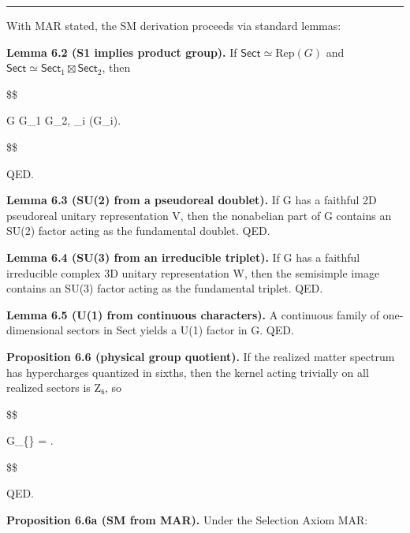 \documentclass[11pt,a4paper]{article}
\theoremstyle{remark}
\begin{document}
\begin{center}\rule{0.5\linewidth}{0.5pt}\end{center}

With MAR stated, the SM derivation proceeds via standard lemmas:

\textbf{Lemma 6.2 (S1 implies product group).} If
\(\mathsf{Sect} \simeq \mathrm{Rep}(G)\) and
\(\mathsf{Sect} \simeq \mathsf{Sect}_1 \boxtimes \mathsf{Sect}_2\),
then

\$\$

G \cong G\_1 \times G\_2,
\qquad
{}\_i \simeq {}(G\_i).

\$\$

QED.

\textbf{Lemma 6.3 (SU(2) from a pseudoreal doublet).} If G has a faithful
2D pseudoreal unitary representation V, then the nonabelian part of G
contains an SU(2) factor acting as the fundamental doublet. QED.

\textbf{Lemma 6.4 (SU(3) from an irreducible triplet).} If G has a faithful
irreducible complex 3D unitary representation W, then the semisimple image
contains an SU(3) factor acting as the fundamental triplet. QED.

\textbf{Lemma 6.5 (U(1) from continuous characters).} A continuous family of
one-dimensional sectors in Sect yields a U(1) factor in G. QED.

\textbf{Proposition 6.6 (physical group quotient).} If the realized matter
spectrum has hypercharges quantized in sixths, then the kernel acting
trivially on all realized sectors is Z₆, so

\$\$

G\_\{\} = .

\$\$

QED.

\textbf{Proposition 6.6a (SM from MAR).} Under the Selection Axiom MAR:
\end{document}
